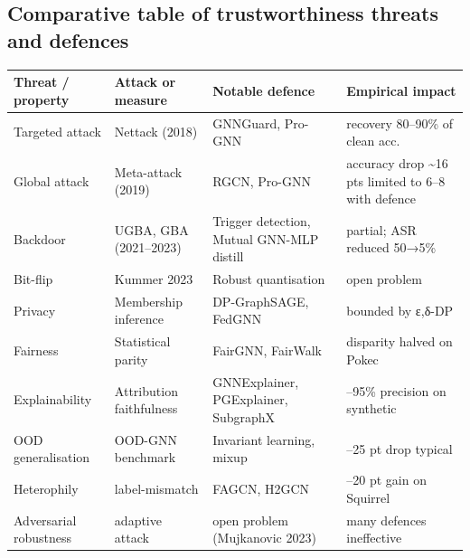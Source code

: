 \subsection{Comparative table of trustworthiness threats and defences}\label{comparative-table-of-trustworthiness-threats-and-defences}

{\def\LTcaptype{none} %
\begin{longtable}[]{@{}
  >{\raggedright\arraybackslash}p{}
  >{\raggedright\arraybackslash}p{}
  >{\raggedright\arraybackslash}p{}
  >{\raggedright\arraybackslash}p{}@{}}
\toprule\noalign{}
\begin{minipage}[b]{\linewidth}\raggedright
Threat / property
\end{minipage} & \begin{minipage}[b]{\linewidth}\raggedright
Attack or measure
\end{minipage} & \begin{minipage}[b]{\linewidth}\raggedright
Notable defence
\end{minipage} & \begin{minipage}[b]{\linewidth}\raggedright
Empirical impact
\end{minipage} \\
\midrule\noalign{}
\endhead
\bottomrule\noalign{}
\endlastfoot
Targeted attack & Nettack (2018) & GNNGuard, Pro-GNN & recovery 80--90\% of clean acc. \\
Global attack & Meta-attack (2019) & RGCN, Pro-GNN & accuracy drop \textasciitilde16 pts limited to 6--8 with defence \\
Backdoor & UGBA, GBA (2021--2023) & Trigger detection, Mutual GNN-MLP distill & partial; ASR reduced 50→5\% \\
Bit-flip & Kummer 2023 & Robust quantisation & open problem \\
Privacy & Membership inference & DP-GraphSAGE, FedGNN & bounded by ε,δ-DP \\
Fairness & Statistical parity & FairGNN, FairWalk & disparity halved on Pokec \\
Explainability & Attribution faithfulness & GNNExplainer, PGExplainer, SubgraphX & 70--95\% precision on synthetic \\
OOD generalisation & OOD-GNN benchmark & Invariant learning, mixup & 5--25 pt drop typical \\
Heterophily & label-mismatch & FAGCN, H2GCN & 5--20 pt gain on Squirrel \\
Adversarial robustness & adaptive attack & open problem (Mujkanovic 2023) & many defences ineffective \\
\end{longtable}
}

